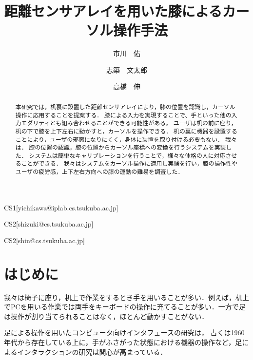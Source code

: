 \documentclass[submit, techrep]{ipsj}
\begin{document}
\title{距離センサアレイを用いた膝によるカーソル操作手法}






\author{市川　佑}{}{CS1}[yichikawa@iplab.cs.tsukuba.ac.jp]
\author{志築　文太郎}{}{CS2}[shizuki@cs.tsukuba.ac.jp]
\author{高橋　伸}{}{CS2}[shin@cs.tsukuba.ac.jp]

\begin{abstract}
本研究では，机裏に設置した距離センサアレイにより，膝の位置を認識し，カーソル操作に応用することを提案する．
膝による入力を実現することで、手といった他の入力モダリティとも組み合わせることができる可能性がある。
ユーザは机の前に座り，机の下で膝を上下左右に動かすと，カーソルを操作できる．
机の裏に機器を設置することにより，ユーザの邪魔になりにくく，身体に装置を取り付ける必要もない．
我々は．
膝の位置の認識，膝の位置からカーソル座標への変換を行うシステムを実装した．
システムは簡単なキャリブレーションを行うことで，様々な体格の人に対応させることができる．
我々はシステムをカーソル操作に適用し実験を行い，膝の操作性やユーザの疲労感，上下左右方向への膝の運動の難易を調査した．
\end{abstract}






\maketitle

\section{はじめに}
我々は椅子に座り，机上で作業をするとき手を用いることが多い．例えば，机上でPCを用いる作業では両手をキーボードの操作に充てることが多い．一方で足は操作が割り当てられることはなく，ほとんど動かすことがない．\par
足による操作を用いたコンピュータ向けインタフェースの研究は，
古くは1960 年代から存在して\cite{1698228}いる上に，手がふさがった状態における機器の操作\cite{Fan:2017:ESF:3123021.3123043}など，足によるインタラクションの研究は関心が高まっている．
\end{document}
